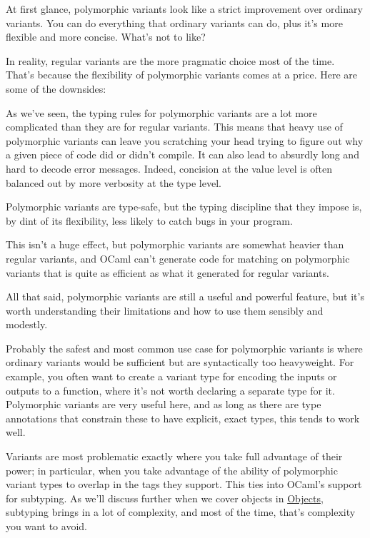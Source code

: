 At first glance, polymorphic variants look like a strict improvement
over ordinary variants. You can do everything that ordinary variants can
do, plus it's more flexible and more concise. What's not to
like?

In reality, regular variants are the more pragmatic choice most of the
time. That's because the flexibility of polymorphic variants comes at a
price. Here are some of the downsides:

\begin{description}
\tightlist
\item[Complexity]
As we've seen, the typing rules for polymorphic variants are a lot more
complicated than they are for regular variants. This means that heavy
use of polymorphic variants can leave you scratching your head trying to
figure out why a given piece of code did or didn't compile. It can also
lead to absurdly long and hard to decode error messages. Indeed,
concision at the value level is often balanced out by more verbosity at
the type level.
\item[Error-finding]
Polymorphic variants are type-safe, but the typing discipline that they
impose is, by dint of its flexibility, less likely to catch bugs in your
program.
\item[Efficiency]
This isn't a huge effect, but polymorphic variants are somewhat heavier
than regular variants, and OCaml can't generate code for matching on
polymorphic variants that is quite as efficient as what it generated for
regular variants.
\end{description}

All that said, polymorphic variants are still a useful and powerful
feature, but it's worth understanding their limitations and how to use
them sensibly and modestly.

Probably the safest and most common use case for polymorphic variants is
where ordinary variants would be sufficient but are syntactically too
heavyweight. For example, you often want to create a variant type for
encoding the inputs or outputs to a function, where it's not worth
declaring a separate type for it. Polymorphic variants are very useful
here, and as long as there are type annotations that constrain these to
have explicit, exact types, this tends to work well.

Variants are most problematic exactly where you take full advantage of
their power; in particular, when you take advantage of the ability of
polymorphic variant types to overlap in the tags they support. This ties
into OCaml's support for subtyping. As we'll discuss further when we
cover objects in \href{objects.html\#objects}{Objects}, subtyping brings
in a lot of complexity, and most of the time, that's complexity you want
to avoid.~~
